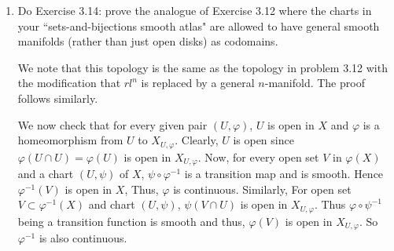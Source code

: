 \documentclass[12pt]{article}
\newcommand{\atlasA}{\mathcal{A}}
\begin{document}
\begin{enumerate}
\begin{mybox}
\end{mybox}

\item Do Exercise 3.14: prove the analogue of Exercise
    3.12 where the charts in your ``sets-and-bijections
    smooth atlas" are allowed to have general smooth
    manifolds (rather than just open disks) as codomains.

\begin{mybox}

    We note that this topology is the same as the topology
    in problem 3.12 with the modification that
    $rl^n$ is replaced by a general $n$-manifold. The proof
    follows similarly.

    \vspace*{2mm}
    We now check that for every given pair $(U,\varphi)$,
    $U$ is open in $X$ and $\varphi$ is a homeomorphism
    from $U$ to $X_{U,\varphi}$. Clearly, $U$ is open
    since $\varphi(U\cap U)=\varphi(U)$ is open
    in $X_{U,\varphi}$. Now, for every open set
    $V$ in $\varphi(X)$ and a chart $(U,\psi)$ of $X$,
    $\psi\circ\varphi^{-1}$ is a transition map and is smooth.
    Hence $\varphi^{-1}(V)$ is open in $X$, Thus, $\varphi$
    is continuous. Similarly, For open set $V\subset
    \varphi^{-1}(X)$ and chart $(U,\psi)$, $\psi(V\cap U)$
    is open in $X_{U,\varphi}$. Thus $\varphi\circ\psi^{-1}$
    being a transition function is smooth and thus,
    $\varphi(V)$ is open in $X_{U,\varphi}$.
    So $\varphi^{-1}$ is also continuous.
\end{mybox}

\end{enumerate}
\end{document}
